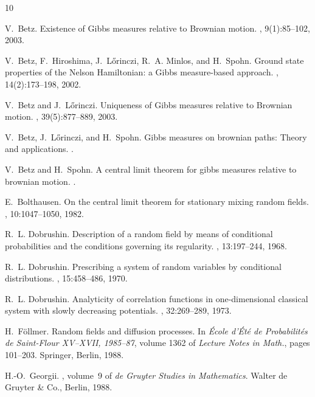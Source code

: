 \documentclass[a4paper,12pt,reqno]{amsart}
\begin{document}

%
%
\begin{thebibliography}{10}

V.~Betz.
\newblock Existence of {G}ibbs measures relative to {B}rownian motion.
, 9(1):85--102, 2003.

V.~Betz, F.~Hiroshima, J.~L{\H{o}}rinczi, R.~A. Minlos, and
  H.~Spohn.
\newblock Ground state properties of the {N}elson {H}amiltonian: a {G}ibbs
  measure-based approach.
, 14(2):173--198, 2002.

V.~Betz and J.~L{\H{o}}rinczi.
\newblock Uniqueness of {G}ibbs measures relative to {B}rownian motion.
, 39(5):877--889,
  2003.

V.~Betz, J.~L{\H{o}}rinczi, and H.~Spohn.
\newblock Gibbs measures on brownian paths: Theory and applications.
.

V.~Betz and H.~Spohn.
\newblock A central limit theorem for gibbs measures relative to brownian
  motion.
.

E.~Bolthausen.
\newblock On the central limit theorem for stationary mixing random fields.
, 10:1047--1050, 1982.

R.~L. Dobrushin.
\newblock Description of a random field by means of conditional probabilities
  and the conditions governing its regularity.
, 13:197--244, 1968.

R.~L. Dobrushin.
\newblock Prescribing a system of random variables by conditional
  distributions.
, 15:458--486, 1970.

R.~L. Dobrushin.
\newblock Analyticity of correlation functions in one-dimensional classical
  system with slowly decreasing potentials.
, 32:269--289, 1973.

H.~F{\"o}llmer.
\newblock Random fields and diffusion processes.
\newblock In {\em \'Ecole d'\'Et\'e de Probabilit\'es de Saint-Flour XV--XVII,
  1985--87}, volume 1362 of {\em Lecture Notes in Math.}, pages 101--203.
  Springer, Berlin, 1988.

H.-O.~Georgii.
, volume~9 of {\em de
  Gruyter Studies in Mathematics}.
\newblock Walter de Gruyter \& Co., Berlin, 1988.


\end{thebibliography}
\end{document}
